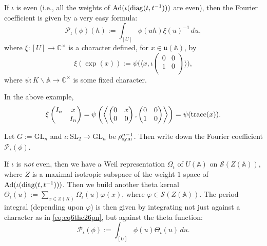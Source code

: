 \documentclass[reqno]{amsart} 
\numberwithin{theorem}{section}
\numberwithin{equation}{section}
\numberwithin{exercise}{section}
\begin{document}
\begin{enumerate}
  If $\iota$ is even (i.e., all the weights of $\operatorname{Ad}(\iota(\operatorname{diag}(t, t^{-1})))$ are even), then the Fourier coefficient is given by a very easy formula:
  \begin{equation}\label{eq:cq6thc26pn}
    \mathcal{P}_\iota(\phi)(h) := \int_{[U]} \phi(u h) \xi(u)^{-1} \, d u,
  \end{equation}
  where $\xi :[U] \rightarrow \mathbb{C}^\times$ is a character defined, for $x \in \mathfrak{u}(\mathbb{A})$, by
  \begin{equation*}
    \xi(\exp(x)) := \psi \bigl( \langle x, \iota \left(
      \begin{smallmatrix}
        0&0\\
        1&0 \\
      \end{smallmatrix}
    \right) \rangle \bigr),
  \end{equation*}
  where $\psi : K \backslash \mathbb{A} \rightarrow \mathbb{C}^\times$ is some fixed character.
  \begin{example}
    In the above example,
    \begin{equation*}
      \xi
      \begin{pmatrix}
        I_n    & x \\
                                                                                        & I_n \\
      \end{pmatrix}
      = \psi \left( \left\langle
          \begin{pmatrix}
            0        & x \\
            0 & 0 \\
          \end{pmatrix},
          \begin{pmatrix}
            0        & 0 \\
            1 & 0 \\
          \end{pmatrix} \right\rangle \right)
      = \psi(\operatorname{trace}(x)).
    \end{equation*}
  \end{example}
  \begin{exercise}
    Let $G := \mathrm{GL}_n$ and $\iota : \mathrm{SL}_2 \rightarrow \mathrm{GL}_n$ be $\rho_{\operatorname{sym}}^{n - 1}$.  Then write down the Fourier coefficient $\mathcal{P}_\iota(\phi)$.
  \end{exercise}

  If $\iota$ is \emph{not} even, then we have a Weil representation $\Omega_\iota$ of $U(\mathbb{A})$ on $\mathcal{S}(Z(\mathbb{A}))$, where $Z$ is a maximal isotropic subspace of the weight $1$ space of $\operatorname{Ad}(\iota(\operatorname{diag}(t, t^{-1})))$.  Then we build another theta kernal $\Theta_\iota(u) := \sum_{x \in Z(K)} \Omega_\iota(u) \varphi(x)$, where $\varphi \in \mathcal{S}(Z(\mathbb{A}))$.  The period integral (depending upon $\varphi$) is then given by integrating not just against a character as in \eqref{eq:cq6thc26pn}, but against the theta function:
  \begin{equation}\label{eq:cq6thc48wh}
    \mathcal{P}_\iota(\phi) := \int_{[U]} \phi(u) \Theta_{\iota}(u) \, d u.
  \end{equation}


\end{enumerate}
\end{document}

